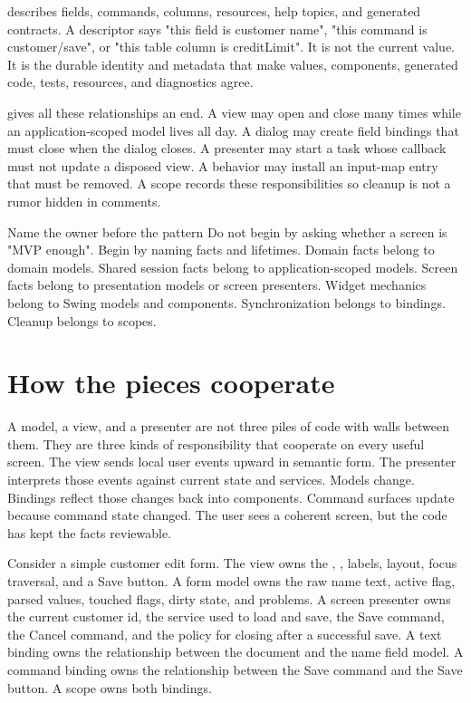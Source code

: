  describes fields, commands, columns, resources, help topics, and generated contracts. A descriptor says "this field is customer name", "this command is customer/save", or "this table column is creditLimit". It is not the current value. It is the durable identity and metadata that make values, components, generated code, tests, resources, and diagnostics agree.

 gives all these relationships an end. A view may open and close many times while an application-scoped model lives all day. A dialog may create field bindings that must close when the dialog closes. A presenter may start a task whose callback must not update a disposed view. A behavior may install an input-map entry that must be removed. A scope records these responsibilities so cleanup is not a rumor hidden in comments.

\begin{principlebox}{Name the owner before the pattern}
Do not begin by asking whether a screen is "MVP enough". Begin by naming facts and lifetimes. Domain facts belong to domain models. Shared session facts belong to application-scoped models. Screen facts belong to presentation models or screen presenters. Widget mechanics belong to Swing models and components. Synchronization belongs to bindings. Cleanup belongs to scopes.
\end{principlebox}

\section{How the pieces cooperate}

A model, a view, and a presenter are not three piles of code with walls between them. They are three kinds of responsibility that cooperate on every useful screen. The view sends local user events upward in semantic form. The presenter interprets those events against current state and services. Models change. Bindings reflect those changes back into components. Command surfaces update because command state changed. The user sees a coherent screen, but the code has kept the facts reviewable.

Consider a simple customer edit form. The view owns the , , labels, layout, focus traversal, and a Save button. A form model owns the raw name text, active flag, parsed values, touched flags, dirty state, and problems. A screen presenter owns the current customer id, the service used to load and save, the Save command, the Cancel command, and the policy for closing after a successful save. A text binding owns the relationship between the  document and the name field model. A command binding owns the relationship between the Save command and the Save button. A scope owns both bindings.

